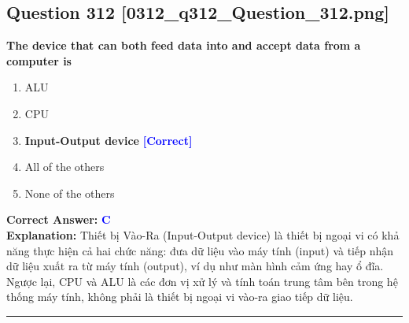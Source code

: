 \documentclass[11pt,a4paper]{article}
\begin{document}
\begin{minipage}{\textwidth}
\subsection*{Question 312 \quad \footnotesize{[0312\_q312\_Question\_312.png]}}
\noindent \textbf{The device that can both feed data into and accept data from a computer is}

\begin{enumerate}[label=\Alph*.]
    \item ALU
    \item CPU
    \item \textbf{Input-Output device} \hfill \textcolor{blue}{\textbf{[Correct]}}
    \item All of the others
    \item None of the others
\end{enumerate}

\noindent \textbf{Correct Answer:} \textcolor{blue}{\textbf{C}} \\[2pt]
\noindent \textbf{Explanation:} Thiết bị Vào-Ra (Input-Output device) là thiết bị ngoại vi có khả năng thực hiện cả hai chức năng: đưa dữ liệu vào máy tính (input) và tiếp nhận dữ liệu xuất ra từ máy tính (output), ví dụ như màn hình cảm ứng hay ổ đĩa. Ngược lại, CPU và ALU là các đơn vị xử lý và tính toán trung tâm bên trong hệ thống máy tính, không phải là thiết bị ngoại vi vào-ra giao tiếp dữ liệu.

\par\vspace{0.3cm}
\hrule
\vspace{0.3cm}
\end{minipage}
\end{document}
